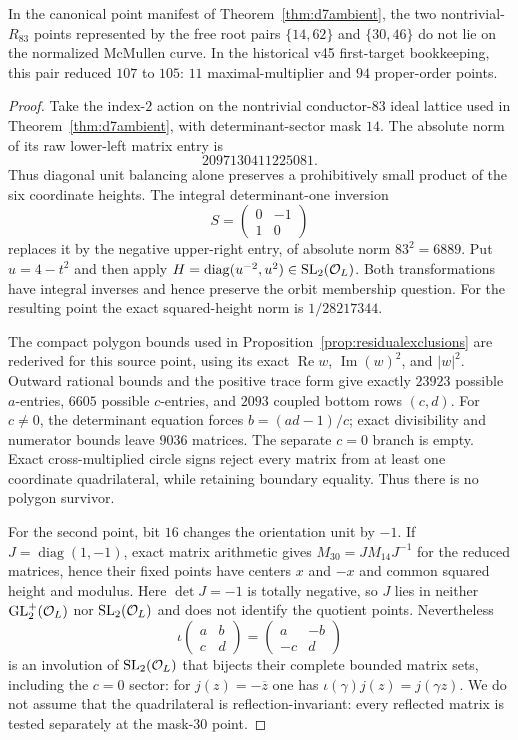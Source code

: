 \begin{proposition}[Two proper-order $d=7$ exclusions]\label{prop:d7mask14}
In the canonical point manifest of Theorem~\ref{thm:d7ambient}, the
two nontrivial-$R_{83}$ points represented by the free root pairs
$\{14,62\}$ and $\{30,46\}$ do not lie on the normalized McMullen curve.
In the historical v45 first-target bookkeeping, this pair reduced $107$ to $105$:
$11$ maximal-multiplier and $94$ proper-order points.
\end{proposition}
\begin{proof}
Take the index-$2$ action on the nontrivial conductor-$83$ ideal lattice used
in Theorem~\ref{thm:d7ambient}, with determinant-sector mask $14$.  The
absolute norm of its raw lower-left matrix entry is
\[
2097130411225081.
\]
Thus diagonal unit balancing alone preserves a prohibitively small product of
the six coordinate heights.  The integral determinant-one
inversion
\[
 S=\begin{pmatrix}0&-1\\1&0\end{pmatrix}
\]
replaces it by the negative upper-right entry, of absolute norm $83^2=6889$.
Put $u=4-t^2$ and then apply
$H=\operatorname{diag}(u^{-2},u^2)\in\mathrm{SL}_2(\mathcal O_L)$.
Both transformations have integral inverses and hence preserve the orbit
membership question.  For the resulting point the exact squared-height norm
is $1/28217344$.

The compact polygon bounds used in
Proposition~\ref{prop:residualexclusions} are rederived for this source point,
using its exact $\operatorname{Re}w$, $\operatorname{Im}(w)^2$, and $|w|^2$.
Outward rational bounds and the positive trace form give exactly $23923$
possible $a$-entries, $6605$ possible $c$-entries, and $2093$ coupled bottom
rows $(c,d)$.  For $c\ne0$, the determinant equation forces
$b=(ad-1)/c$; exact divisibility and numerator bounds leave $9036$ matrices.
The separate $c=0$ branch is empty.  Exact cross-multiplied circle signs reject
every matrix from at least one coordinate quadrilateral, while retaining
boundary equality.  Thus there is no polygon survivor.

For the second point, bit $16$ changes the orientation unit by $-1$.  If
$J=\operatorname{diag}(1,-1)$, exact matrix arithmetic gives
$M_{30}=JM_{14}J^{-1}$ for the reduced matrices, hence their fixed points have
centers $x$ and $-x$ and common squared height and modulus.  Here
$\det J=-1$ is totally negative, so $J$ lies in neither
$\operatorname{GL}_2^+(\mathcal O_L)$ nor $\operatorname{SL}_2(\mathcal O_L)$ and does not identify the quotient points.
Nevertheless
\[
 \iota\begin{pmatrix}a&b\\c&d\end{pmatrix}
 =\begin{pmatrix}a&-b\\-c&d\end{pmatrix}
\]
is an involution of $\operatorname{SL}_2(\mathcal O_L)$ that bijects their complete bounded matrix
sets, including the $c=0$ sector: for $j(z)=-\overline z$ one has
$\iota(\gamma)j(z)=j(\gamma z)$.  We do not assume that the quadrilateral is
reflection-invariant: every reflected matrix is tested separately at the
mask-$30$ point.


\end{proof}

